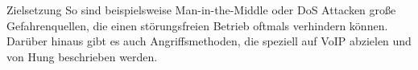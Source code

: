 \begin{section}{Zielsetzung}
		So sind beispielsweise Man-in-the-Middle oder \DIFdelbegin {}\DIFdelend \DIFaddbegin \ac{DoS} 
		\DIFaddend Attacken große Gefahrenquellen, die einen störungsfreien Betrieb oftmals verhindern können. 
		Darüber hinaus gibt es auch Angriffsmethoden, die speziell auf VoIP 
		abzielen und von Hung \DIFdelbegin {}\DIFdelend \DIFaddbegin {}\cite{Hung:2006:seciss} \DIFaddend beschrieben werden.
		\DIFdelbegin %
\DIFdelend \\ 
\DIFdelbegin %
\DIFdelend \DIFaddbegin 

\DIFaddend \end{section}
\pagebreak

